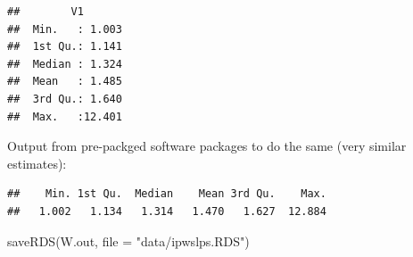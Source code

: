\documentclass[
]{book}
\newenvironment{Shaded}{\begin{snugshade}}{\end{snugshade}}
\newcommand{\AttributeTok}[1]{\textcolor[rgb]{0.77,0.63,0.00}{#1}}
\newcommand{\DecValTok}[1]{\textcolor[rgb]{0.00,0.00,0.81}{#1}}
\newcommand{\FunctionTok}[1]{\textcolor[rgb]{0.00,0.00,0.00}{#1}}
\newcommand{\NormalTok}[1]{#1}
\newcommand{\OtherTok}[1]{\textcolor[rgb]{0.56,0.35,0.01}{#1}}
\newcommand{\SpecialCharTok}[1]{\textcolor[rgb]{0.00,0.00,0.00}{#1}}
\newcommand{\StringTok}[1]{\textcolor[rgb]{0.31,0.60,0.02}{#1}}
\begin{document}
\begin{Shaded}
\end{Shaded}

\begin{verbatim}
##        V1        
##  Min.   : 1.003  
##  1st Qu.: 1.141  
##  Median : 1.324  
##  Mean   : 1.485  
##  3rd Qu.: 1.640  
##  Max.   :12.401
\end{verbatim}

Output from pre-packged software packages to do the same (very similar estimates):

\begin{Shaded}
\end{Shaded}

\begin{verbatim}
##    Min. 1st Qu.  Median    Mean 3rd Qu.    Max. 
##   1.002   1.134   1.314   1.470   1.627  12.884
\end{verbatim}

\begin{Shaded}
\begin{Highlighting}[]
\FunctionTok{saveRDS}\NormalTok{(W.out, }\AttributeTok{file =} \StringTok{"data/ipwslps.RDS"}\NormalTok{)}
\end{Highlighting}
\end{Shaded}
\end{document}
